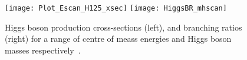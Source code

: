 \begin{figure}[ht]
  \centering
  \texttt{[image: Plot\_Escan\_H125\_xsec]}%
  \texttt{[image: HiggsBR\_mhscan]}

  \caption[Higgs boson production cross sections and branching ratios.]{Higgs
    boson production cross-sections (left), and branching ratios (right) for a range
    of centre of meass energies and Higgs boson masses
    respectively~\cite{CERN-yellow-4}.}%
  \label{fig:higgs-br}
\end{figure}%